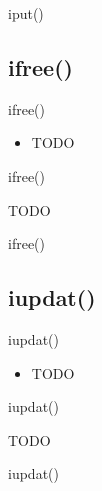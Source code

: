\documentclass{beamer}
\begin{document}
\begin{frame}{iput()}
\end{frame}




\subsection{ifree()}

\begin{frame}{ifree()}
    \begin{itemize}
        \item TODO
    \end{itemize}
\end{frame}

\begin{frame}{ifree()}
    \begin{algorithmic}[1]
        \State TODO
    \end{algorithmic}
\end{frame}

\begin{frame}{ifree()}
\end{frame}




\subsection{iupdat()}

\begin{frame}{iupdat()}
    \begin{itemize}
        \item TODO
    \end{itemize}
\end{frame}

\begin{frame}{iupdat()}
    \begin{algorithmic}[1]
        \State TODO
    \end{algorithmic}
\end{frame}

\begin{frame}{iupdat()}
\end{frame}
\end{document}

